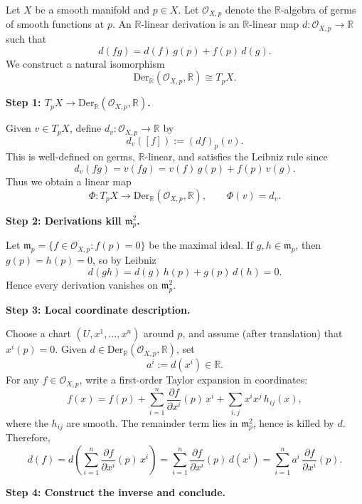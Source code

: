 \begin{solution}
Let $X$ be a smooth manifold and $p\in X$. Let $\mathcal{O}_{X,p}$ denote the $\mathbb{R}$-algebra of germs
of smooth functions at $p$. An $\mathbb{R}$-linear derivation is an $\mathbb{R}$-linear map
$d:\mathcal{O}_{X,p}\to \mathbb{R}$ such that
\[
d(fg)=d(f)\,g(p)+f(p)\,d(g).
\]
We construct a natural isomorphism
\[
\mathrm{Der}_{\mathbb{R}}(\mathcal{O}_{X,p},\mathbb{R}) \cong T_pX.
\]

\par\medskip\noindent\textbf{Step 1: $T_pX \to \mathrm{Der}_{\mathbb{R}}(\mathcal{O}_{X,p},\mathbb{R})$.}\par\smallskip

Given $v\in T_pX$, define $d_v:\mathcal{O}_{X,p}\to \mathbb{R}$ by
\[
d_v([f]) := (df)_p(v).
\]
This is well-defined on germs, $\mathbb{R}$-linear, and satisfies the Leibniz rule since
\[
d_v(fg) = v(fg) = v(f)\,g(p) + f(p)\,v(g).
\]
Thus we obtain a linear map
\[
\Phi:T_pX\to \mathrm{Der}_{\mathbb{R}}(\mathcal{O}_{X,p},\mathbb{R}),\qquad \Phi(v)=d_v.
\]

\par\medskip\noindent\textbf{Step 2: Derivations kill $\mathfrak{m}_p^2$.}\par\smallskip

Let $\mathfrak{m}_p=\{f\in \mathcal{O}_{X,p}: f(p)=0\}$ be the maximal ideal.
If $g,h\in \mathfrak{m}_p$, then $g(p)=h(p)=0$, so by Leibniz
\[
d(gh)=d(g)\,h(p)+g(p)\,d(h)=0.
\]
Hence every derivation vanishes on $\mathfrak{m}_p^2$.

\par\medskip\noindent\textbf{Step 3: Local coordinate description.}\par\smallskip

Choose a chart $(U,x^1,\dots,x^n)$ around $p$, and assume (after translation) that $x^i(p)=0$.
Given $d\in \mathrm{Der}_{\mathbb{R}}(\mathcal{O}_{X,p},\mathbb{R})$, set
\[
a^i := d(x^i)\in \mathbb{R}.
\]
For any $f\in\mathcal{O}_{X,p}$, write a first-order Taylor expansion in coordinates:
\[
f(x)=f(p)+\sum_{i=1}^n \frac{\partial f}{\partial x^i}(p)\,x^i + \sum_{i,j} x^i x^j\,h_{ij}(x),
\]
where the $h_{ij}$ are smooth. The remainder term lies in $\mathfrak{m}_p^2$, hence is killed by $d$.
Therefore,
\[
d(f)= d\!\left(\sum_{i=1}^n \frac{\partial f}{\partial x^i}(p)\,x^i\right)
=\sum_{i=1}^n \frac{\partial f}{\partial x^i}(p)\,d(x^i)
=\sum_{i=1}^n a^i\,\frac{\partial f}{\partial x^i}(p).
\]

\par\medskip\noindent\textbf{Step 4: Construct the inverse and conclude.}\par\smallskip


\end{solution}
